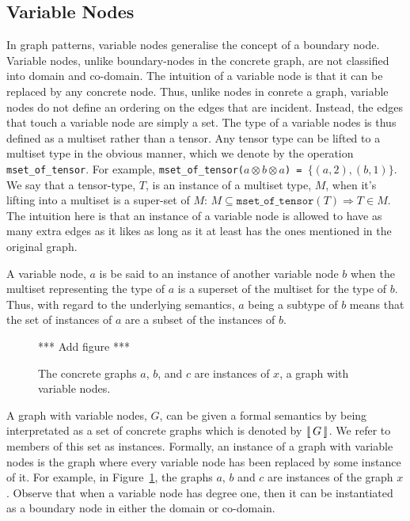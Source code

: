 \documentclass[runningheads]{llncs}
\newcommand{\tensor}{\otimes}
\newcommand{\vinterp}[1]{\lfloor\hspace{-0.27em}|\, #1\, |\hspace{-0.27em}\rfloor}
\begin{document}
\subsection{Variable Nodes}

In graph patterns, variable nodes generalise the concept of a boundary
node. Variable nodes, unlike boundary-nodes in the concrete graph, are
not classified into domain and co-domain. The intuition of a variable
node is that it can be replaced by any concrete node. Thus, unlike
nodes in conrete a graph, variable nodes do not define an ordering on
the edges that are incident. Instead, the edges that touch a variable
node are simply a set. The type of a variable nodes is thus defined as
a multiset rather than a tensor. Any tensor type can be lifted to a
multiset type in the obvious manner, which we denote by the operation
{\tt mset\_of\_tensor}. For example, {\tt mset\_of\_tensor($a \tensor
  b \tensor a$) = $\{(a,2), (b,1)\}$}. We say that a tensor-type, $T$,
is an instance of a multiset type, $M$, when it's lifting into a
multiset is a super-set of $M$: $ M \subseteq
\mathtt{mset\_of\_tensor}(T) \Longrightarrow T \in M$. The intuition
here is that an instance of a variable node is allowed to have as many
extra edges as it likes as long as it at least has the ones mentioned
in the original graph.

A variable node, $a$ is be said to an instance of another variable
node $b$ when the multiset representing the type of $a$ is a superset
of the multiset for the type of $b$. Thus, with regard to the
underlying semantics, $a$ being a subtype of $b$ means that the set of
instances of $a$ are a subset of the instances of $b$.

\begin{figure}[t]
*** Add figure *** 
\label{node-variable-instances-fig}\caption{The concrete graphs $a$,
  $b$, and $c$ are instances of $x$, a graph with variable nodes.}
\end{figure}

A graph with variable nodes, $G$, can be given a formal semantics by
being interpretated as a set of concrete graphs which is denoted by
$\vinterp{G}$. We refer to members of this set as
instances. Formally, an instance of a graph with variable nodes is the
graph where every variable node has been replaced by some instance of
it. For example, in Figure~\ref{node-variable-instances-fig}, the
graphs $a$, $b$ and $c$ are instances of the graph $x$. Observe that
when a variable node has degree one, then it can be instantiated as a
boundary node in either the domain or co-domain.
\end{document}
